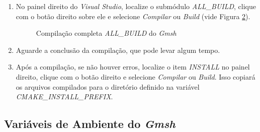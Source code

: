 \documentclass[a4paper,11pt]{article}
\newcommand{\build}{\textit{build}}
\newcommand{\visualstudio}{\textit{Visual Studio}}
\newcommand{\gmsh}{\textit{Gmsh}}
\begin{document}
\begin{enumerate}
\begin{enumerate}
		\begin{figure}[H]\centering
			\caption{Definição do tipo de \build{} e arquitetura no \visualstudio{}}\label{fig:gmshvsproject}
		\end{figure}
		
		\item No painel direito do \visualstudio{}, localize o submódulo \emph{ALL\_BUILD}, clique com o botão direito sobre ele e selecione \emph{Compilar} ou \emph{Build} (vide Figura \ref{fig:gmshvsprojectall}).
		
		\begin{figure}[H]\centering
			\caption{Compilação completa \emph{ALL\_BUILD} do \gmsh{}}\label{fig:gmshvsprojectall}
		\end{figure}
		
		\item Aguarde a conclusão da compilação, que pode levar algum tempo.
		\item Após a compilação, se não houver erros, localize o item \emph{INSTALL} no painel direito, clique com o botão direito e selecione \emph{Compilar} ou \emph{Build}. Isso copiará os arquivos compilados para o diretório definido na variável \emph{CMAKE\_INSTALL\_PREFIX}.
	\end{enumerate}
\end{enumerate}
\subsection*{Variáveis de Ambiente do \gmsh{}}
\end{document}
